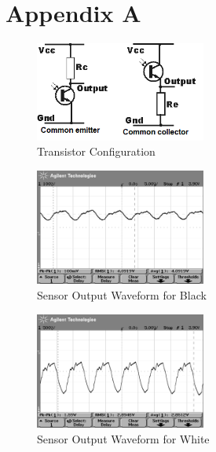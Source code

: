\documentclass{article}
\begin{document}
\clearpage

\section{Appendix A}

\begin{figure}[!h]
\centerline{\includegraphics[width=0.5\textwidth]{transistor-config}}
\caption{Transistor Configuration}
\label{fig:transconfig}
\end{figure}

\begin{figure}[!h]
\centerline{\includegraphics[width=0.5\textwidth]{Waveform-BlackLine}}
\caption{Sensor Output Waveform for Black}
\label{fig:waveblack}
\end{figure}

\begin{figure}[!h]
\centerline{\includegraphics[width=0.5\textwidth]{Waveform-White}}
\caption{Sensor Output Waveform for White}
\label{fig:wavewhite}
\end{figure}
\end{document}
